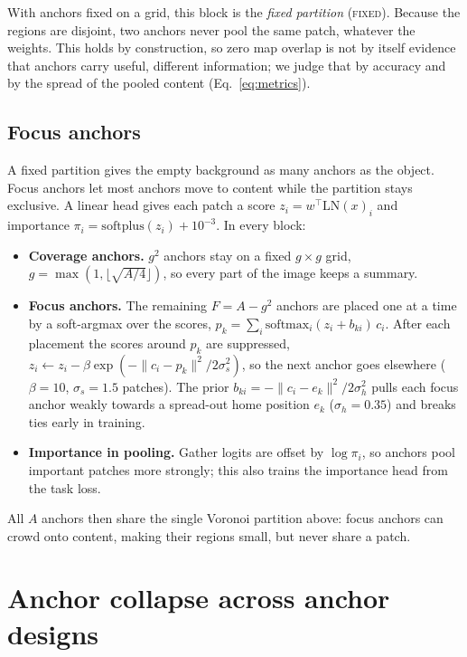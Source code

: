 \documentclass[10pt]{article}
\newcommand{\fixed}{\textsc{fixed}}
\begin{document}
With anchors fixed on a grid, this block is the \emph{fixed partition} (\fixed). Because the
regions are disjoint, two anchors never pool the same patch, whatever the weights. This holds by
construction, so zero map overlap is not by itself evidence that anchors carry useful, different
information; we judge that by accuracy and by the spread of the pooled content (Eq.~\ref{eq:metrics}).

\subsection{Focus anchors}
\label{sec:focus}

A fixed partition gives the empty background as many anchors as the object. Focus anchors let
most anchors move to content while the partition stays exclusive. A linear head gives each patch
a score $z_i=w^{\top}\mathrm{LN}(x)_i$ and importance $\pi_i=\mathrm{softplus}(z_i)+10^{-3}$. In
every block:
\begin{itemize}
\item \textbf{Coverage anchors.} $g^2$ anchors stay on a fixed $g\times g$ grid,
$g=\max(1,\lfloor\sqrt{A/4}\rfloor)$, so every part of the image keeps a summary.
\item \textbf{Focus anchors.} The remaining $F=A-g^2$ anchors are placed one at a time by a
soft-argmax over the scores, $p_k=\sum_i \mathrm{softmax}_i(z_i+b_{ki})\,c_i$. After each
placement the scores around $p_k$ are suppressed,
$z_i\leftarrow z_i-\beta\exp(-\|c_i-p_k\|^2/2\sigma_s^2)$, so the next anchor goes elsewhere
($\beta=10$, $\sigma_s=1.5$ patches). The prior $b_{ki}=-\|c_i-e_k\|^2/2\sigma_h^2$ pulls each
focus anchor weakly towards a spread-out home position $e_k$ ($\sigma_h=0.35$) and breaks ties
early in training.
\item \textbf{Importance in pooling.} Gather logits are offset by $\log\pi_i$, so anchors pool
important patches more strongly; this also trains the importance head from the task loss.
\end{itemize}
All $A$ anchors then share the single Voronoi partition above: focus anchors can crowd onto
content, making their regions small, but never share a patch.

\section{Anchor collapse across anchor designs}
\label{sec:collapse}
\end{document}
